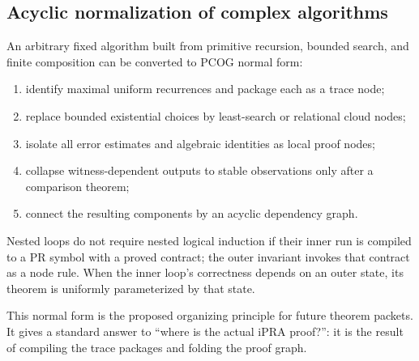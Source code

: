 \subsection{Acyclic normalization of complex algorithms}

An arbitrary fixed algorithm built from primitive recursion, bounded search,
and finite composition can be converted to PCOG normal form:
\begin{enumerate}
\item identify maximal uniform recurrences and package each as a trace node;
\item replace bounded existential choices by least-search or relational cloud
nodes;
\item isolate all error estimates and algebraic identities as local proof
nodes;
\item collapse witness-dependent outputs to stable observations only after a
comparison theorem;
\item connect the resulting components by an acyclic dependency graph.
\end{enumerate}

Nested loops do not require nested logical induction if their inner run is
compiled to a PR symbol with a proved contract; the outer invariant invokes
that contract as a node rule.  When the inner loop's correctness depends on an
outer state, its theorem is uniformly parameterized by that state.

This normal form is the proposed organizing principle for future theorem
packets.  It gives a standard answer to ``where is the actual iPRA proof?'':
it is the result of compiling the trace packages and folding the proof graph.
